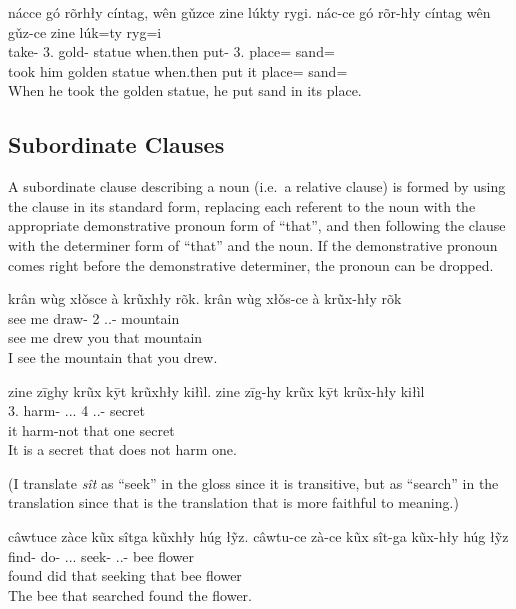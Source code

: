 \begin{exe}
    \ex
    \glt
    nácce gó rõrhły cíntag, wên gǔzce zine lúkty rygi.
    \glll
    nác-ce gó rõr-hły cíntag wên gǔz-ce zine lúk=ty ryg=i \\
    take-\Pst{} 3\Sg{}.\Anim{} gold-\Adj{} statue when.then put-\Pst{} 3\Sg{}.\Inanim{} place=\Poss{} sand=\IllThree{} \\
    took him golden statue when.then put it place=\Poss{} sand=\IllThree{} \\
    \glt
    When he took the golden statue, he put sand in its place.
\end{exe}

\subsection{Subordinate Clauses}\label{subsec:subordinate-clauses}

A subordinate clause describing a noun (i.e.\ a relative clause)
is formed by using the clause in its standard form,
replacing each referent to the noun with
the appropriate demonstrative pronoun form of ``that'',
and then following the clause with
the determiner form of ``that'' and the noun.
If the demonstrative pronoun comes right before
the demonstrative determiner, the pronoun can be dropped.

\begin{exe}
    \ex
    \glt
    krân wùg xłǒsce à krũxhły rõk.
    \glll
    krân wùg xłǒs-ce à krũx-hły rõk \\
    see me draw-\Pst{} 2\Sg{} \Dem{}.\Dist{}.\Inanim{}-\Adj{} mountain \\
    see me drew you that mountain \\
    \glt
    I see the mountain that you drew.
\end{exe}

\begin{exe}
    \ex
    \glt
    zine zīghy krũx kȳt krũxhły kiłìl.
    \glll
    zine zīg-hy krũx kȳt krũx-hły kiłìl \\
    3\Sg{}.\Inanim{} harm-\Neg{} \Dem.\Dist{}.\Inanim{}.\Sg{} 4\Sg{} \Dem.\Dist{}.\Inanim{}-\Adj{} secret \\
    it harm-not that one secret \\
    \glt
    It is a secret that does not harm one.
\end{exe}

(I translate \textit{sît} as ``seek'' in the gloss since it is transitive,
but as ``search'' in the translation since that is the translation
that is more faithful to meaning.)
\begin{exe}
    \ex
    \glt
    câwtuce zàce kũx sîtga kũxhły húg łỹz.
    \glll
    câwtu-ce zà-ce kũx sît-ga kũx-hły húg łỹz \\
    find-\Pst{} do-\Pst{} \Dem{}.\Dist{}.\Anim{}.\Sg{} seek-\Ger{} \Dem{}.\Dist{}.\Anim{}-\Adj{} bee flower \\
    found did that seeking that bee flower \\
    \glt
    The bee that searched found the flower.
\end{exe}

